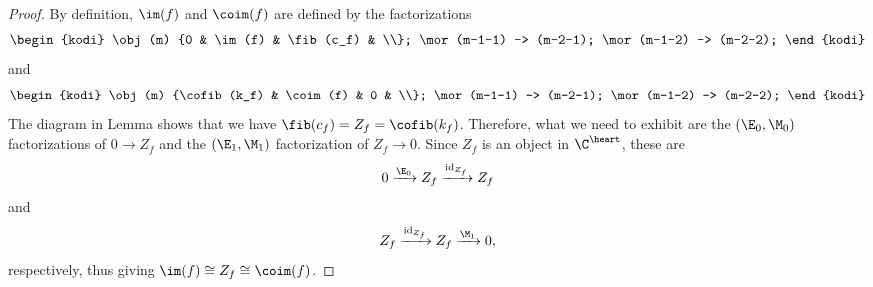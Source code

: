 \begin{proof}
By definition, $\im(f)$ and $\coim(f)$ are defined by the factorizations
\[
\begin{kodi}
\obj (m) {0 & \im(f) & \fib(c_f) & \\};
\mor (m-1-1) -> (m-2-1);
\mor (m-1-2) -> (m-2-2);
\end{kodi}
\]
and
\[
\begin{kodi}
\obj (m) {\cofib(k_f) & \coim(f) & 0 & \\};
\mor (m-1-1) -> (m-2-1);
\mor (m-1-2) -> (m-2-2);
\end{kodi}
\]
The diagram in Lemma  shows that we have $\fib(c_f)=Z_f=\cofib(k_f)$. Therefore, 
what we need to exhibit are the $(\E_0,\M_0)$ factorizations of $0\to Z_f$ and the $(\E_1,\M_1)$ factorization of $Z_f\to 0$. Since $Z_f$ is an object in $\C^\heart$, these are
\[
0\xrightarrow{\E_0}Z_f\xrightarrow{\mathrm{id}_{Z_f}}Z_f
\]
and 
\[
Z_f\xrightarrow{\mathrm{id}_{Z_f}}Z_f\xrightarrow{\M_1}0,
\]
respectively, thus giving $\im(f)\cong Z_f\cong \coim(f)$.
\end{proof}

